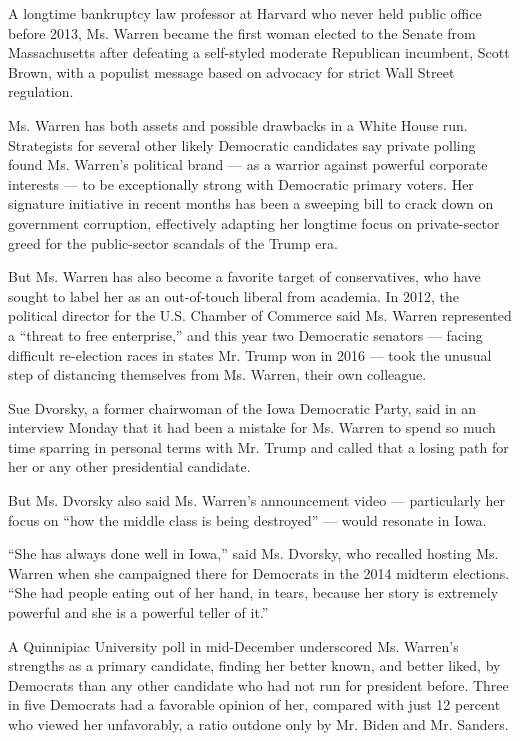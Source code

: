 A longtime bankruptcy law professor at Harvard who never held public
office before 2013, Ms. Warren became the first woman elected to the
Senate from Massachusetts after defeating a self-styled moderate
Republican incumbent, Scott Brown, with a populist message based on
advocacy for strict Wall Street regulation.

Ms. Warren has both assets and possible drawbacks in a White House run.
Strategists for several other likely Democratic candidates say private
polling found Ms. Warren's political brand --- as a warrior against
powerful corporate interests --- to be exceptionally strong with
Democratic primary voters. Her signature initiative in recent months has
been a sweeping bill to crack down on government corruption, effectively
adapting her longtime focus on private-sector greed for the
public-sector scandals of the Trump era.

But Ms. Warren has also become a favorite target of conservatives, who
have sought to label her as an out-of-touch liberal from academia. In
2012, the political director for the U.S. Chamber of Commerce said Ms.
Warren represented a ``threat to free enterprise,'' and this year two
Democratic senators --- facing difficult re-election races in states Mr.
Trump won in 2016 --- took the unusual step of distancing themselves
from Ms. Warren, their own colleague.

Sue Dvorsky, a former chairwoman of the Iowa Democratic Party, said in
an interview Monday that it had been a mistake for Ms. Warren to spend
so much time sparring in personal terms with Mr. Trump and called that a
losing path for her or any other presidential candidate.

But Ms. Dvorsky also said Ms. Warren's announcement video ---
particularly her focus on ``how the middle class is being destroyed''
--- would resonate in Iowa.

``She has always done well in Iowa,'' said Ms. Dvorsky, who recalled
hosting Ms. Warren when she campaigned there for Democrats in the 2014
midterm elections. ``She had people eating out of her hand, in tears,
because her story is extremely powerful and she is a powerful teller of
it.''

A Quinnipiac University poll in mid-December underscored Ms. Warren's
strengths as a primary candidate, finding her better known, and better
liked, by Democrats than any other candidate who had not run for
president before. Three in five Democrats had a favorable opinion of
her, compared with just 12 percent who viewed her unfavorably, a ratio
outdone only by Mr. Biden and Mr. Sanders.

